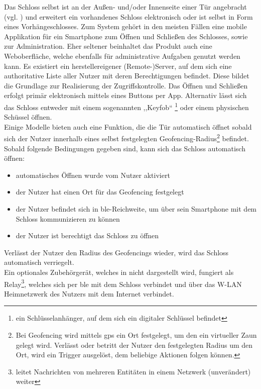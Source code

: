 	    \indent Das Schloss selbst ist an der Außen- und/oder Innenseite einer Tür angebracht (vgl. ) und erweitert ein vorhandenes Schloss elektronisch oder ist selbst in Form eines Vorhängeschlosses\cite{Ho2016}. 
		Zum System gehört in den meisten Fällen eine mobile Applikation für ein Smartphone zum Öffnen und Schließen des Schlosses, sowie zur Administration\cite{Fuller2017}. 
        Eher seltener beinhaltet das Produkt auch eine Weboberfläche, welche ebenfalls für administrative Aufgaben genutzt werden kann\cite{Ho2016}. 
		Es existiert ein herstellereigener (Remote-)Server, auf dem sich eine authoritative Liste aller Nutzer mit deren Berechtigungen befindet. 
        Diese bildet die Grundlage zur Realisierung der Zugriffskontrolle.\cite{Fuller2017} 
        Das Öffnen und Schließen erfolgt primär elektronisch mittels eines Buttons per App.
        Alternativ lässt sich das Schloss entweder mit einem sogenannten ,,Keyfob`` 
        \footnote{ein Schlüsselanhänger, auf dem sich ein digitaler Schlüssel befindet} 
        oder einem physischen Schüssel öffnen\cite{Ho2016}. 
        \medskip\\
        Einige Modelle bieten auch eine Funktion, die die Tür automatisch öffnet sobald sich der Nutzer innerhalb eines selbst festgelegten Geofencing-Radius\!\footnote{Bei Geofencing wird mittels \gls{gps} ein Ort festgelegt, um den ein virtueller Zaun gelegt wird. 
        Verlässt oder betritt der Nutzer den festgelegten Radius um den Ort, wird ein Trigger ausgelöst, dem beliebige Aktionen folgen können.} befindet. 
        \smallskip\\
        Sobald folgende Bedingungen gegeben sind, kann sich das Schloss automatisch öffnen: 
        \begin{itemize}[noitemsep]
        	\item automatisches Öffnen wurde vom Nutzer aktiviert
        	\item der Nutzer hat einen Ort für das Geofencing festgelegt
        	\item der Nutzer befindet sich in \gls{ble}-Reichweite, um über sein Smartphone mit dem Schloss kommunizieren zu können
        	\item der Nutzer ist berechtigt das Schloss zu öffnen
        \end{itemize}
    	Verlässt der Nutzer den Radius des Geofencings wieder, wird das Schloss automatisch verriegelt. 
    	\medskip\\
		Ein optionales Zubehörgerät, welches in  nicht dargestellt wird, fungiert als Relay\!\footnote{leitet Nachrichten von mehreren Entitäten in einem Netzwerk (unverändert) weiter}, welches sich per \gls{ble} mit dem Schloss verbindet und über das W-LAN Heimnetzwerk des Nutzers mit dem Internet verbindet.
		
